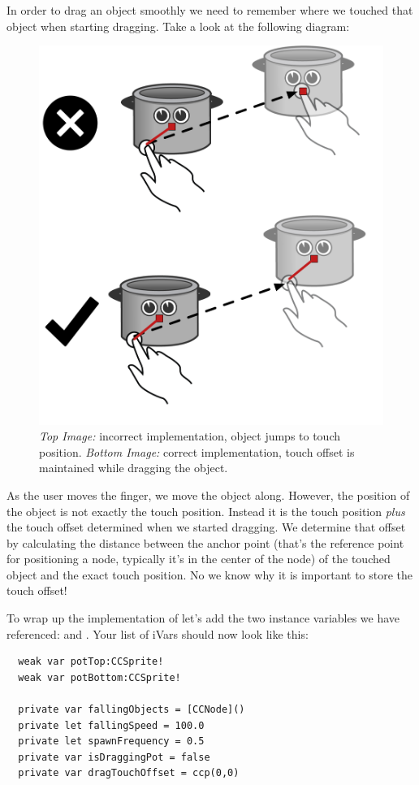 In order to drag an object smoothly we need to remember where we touched that
object when starting dragging. Take a look at the following diagram:
\begin{figure}[H]
		\centering
		\includegraphics[width=0.4\linewidth]{images/Chapter3/dragging_offset.png}
		\caption{\textit{Top Image:} incorrect implementation, object jumps to touch
		position. \textit{Bottom Image:} correct implementation, touch offset is
		maintained while dragging the object.}
		\label{user_interaction_touch_offset}
\end{figure}
As the user moves the finger, we move the object along. However, the position of
the object is not exactly the touch position. Instead it is the touch position
\textit{plus} the touch offset determined when we started dragging. We determine
that offset by calculating the distance between the anchor point (that's the
reference point for positioning a node, typically it's in the center of the
node) of the touched object and the exact touch position. 
No we know why it is important to store the touch offset!

\begin{leftbar}
To wrap up the implementation of  let's add the two
instance variables we have referenced:  and
. Your list of iVars should now look like this:
\begin{lstlisting}
  weak var potTop:CCSprite!
  weak var potBottom:CCSprite!
  
  private var fallingObjects = [CCNode]()
  private let fallingSpeed = 100.0
  private let spawnFrequency = 0.5
  private var isDraggingPot = false
  private var dragTouchOffset = ccp(0,0)
\end{lstlisting}
\end{leftbar}

